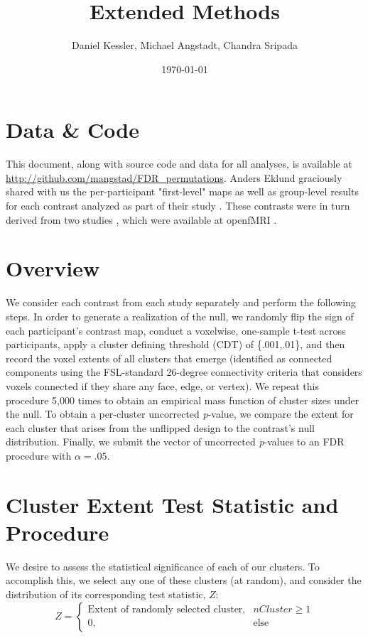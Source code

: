 \documentclass{article}
\author{Daniel Kessler, Michael Angstadt, Chandra Sripada}
\date{\today}
\title{Extended Methods}
\begin{document}
\maketitle

\section{Data \& Code}
This document, along with source code and data for all analyses, is available at \url{http://github.com/mangstad/FDR_permutations}.
Anders Eklund graciously shared with us the per-participant "first-level" maps as well as group-level results for each contrast analyzed as part of their study  \cite{eklund_cluster_2016}.
These contrasts were in turn derived from two studies \cite{duncan_consistency_2009,tom_neural_2007}, which were available at openfMRI \cite{poldrack_toward_2013}.

\section{Overview}
We consider each contrast from each study separately and perform the following steps.
In order to generate a realization of the null, we randomly flip the sign of each participant's contrast map, conduct a voxelwise, one-sample t-test across participants, apply a cluster defining threshold (CDT) of \{.001,.01\}, and then record the voxel extents of all clusters that emerge (identified as connected components using the FSL-standard 26-degree connectivity criteria that considers voxels connected if they share any face, edge, or vertex).
We repeat this procedure 5,000 times to obtain an empirical mass function of cluster sizes under the null.
To obtain a per-cluster uncorrected \textit{p}-value, we compare the extent for each cluster that arises from the unflipped design to the contrast's null distribution.
Finally, we submit the vector of uncorrected \textit{p}-values to an FDR procedure \cite{benjamini_controlling_1995} with $\alpha = .05$.

\section{Cluster Extent Test Statistic and Procedure}
We desire to assess the statistical significance of each of our clusters.
To accomplish this, we select any one of these clusters (at random), and consider the distribution of its corresponding test statistic, $Z$:
\begin{equation}
  Z = 
  \begin{cases}
    \text{Extent of randomly selected cluster}, & nCluster\geq1\\
    0, & \text{else}
  \end{cases}
\end{equation}
\end{document}
